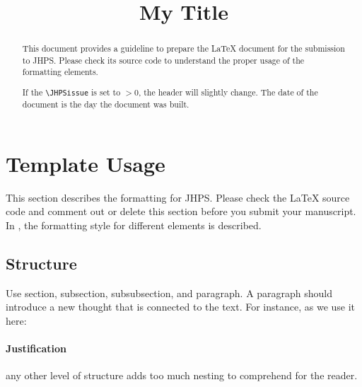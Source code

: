\documentclass{jhps}
\begin{document}



\title{My Title}

\maketitle

\begin{abstract}
This document provides a guideline to prepare the LaTeX document for the submission to JHPS.
Please check its source code to understand the proper usage of the formatting elements.

If the \verb|\JHPSissue| is set to $>0$, the header will slightly change.
The date of the document is the day the document was built.
\end{abstract}

\setcounter{section}{-1}
\section{Template Usage}
\label{sec:usage}

This section describes the formatting for JHPS.
Please check the LaTeX source code and comment out or delete this section before you submit your manuscript.
In , the formatting style for different elements is described.

\subsection{Structure}

Use section, subsection, subsubsection, and paragraph.
A paragraph should introduce a new thought that is connected to the text.
For instance, as we use it here:

\paragraph{Justification} any other level of structure adds too much nesting to comprehend for the reader.
\end{document}
